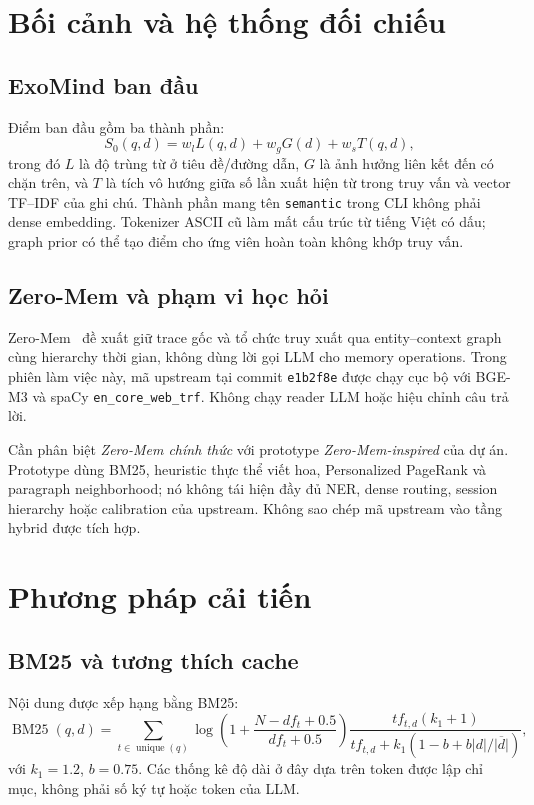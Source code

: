 \documentclass[11pt,a4paper]{article}
\begin{document}
\section{Bối cảnh và hệ thống đối chiếu}
\subsection{ExoMind ban đầu}
Điểm ban đầu gồm ba thành phần:
\begin{equation}
S_0(q,d)=w_l L(q,d)+w_g G(d)+w_s T(q,d),
\end{equation}
trong đó $L$ là độ trùng từ ở tiêu đề/đường dẫn, $G$ là ảnh hưởng liên kết đến có chặn trên, và $T$ là tích vô hướng giữa số lần xuất hiện từ trong truy vấn và vector TF--IDF của ghi chú. Thành phần mang tên \texttt{semantic} trong CLI không phải dense embedding. Tokenizer ASCII cũ làm mất cấu trúc từ tiếng Việt có dấu; graph prior có thể tạo điểm cho ứng viên hoàn toàn không khớp truy vấn.

\subsection{Zero-Mem và phạm vi học hỏi}
Zero-Mem~\cite{zeromem} đề xuất giữ trace gốc và tổ chức truy xuất qua entity--context graph cùng hierarchy thời gian, không dùng lời gọi LLM cho memory operations. Trong phiên làm việc này, mã upstream tại commit \texttt{e1b2f8e} được chạy cục bộ với BGE-M3 và spaCy \texttt{en\_core\_web\_trf}. Không chạy reader LLM hoặc hiệu chỉnh câu trả lời.

Cần phân biệt \emph{Zero-Mem chính thức} với prototype \emph{Zero-Mem-inspired} của dự án. Prototype dùng BM25, heuristic thực thể viết hoa, Personalized PageRank và paragraph neighborhood; nó không tái hiện đầy đủ NER, dense routing, session hierarchy hoặc calibration của upstream. Không sao chép mã upstream vào tầng hybrid được tích hợp.

\section{Phương pháp cải tiến}
\subsection{BM25 và tương thích cache}
Nội dung được xếp hạng bằng BM25:
\begin{equation}
\operatorname{BM25}(q,d)=\sum_{t\in\operatorname{unique}(q)}
\log\left(1+\frac{N-df_t+0.5}{df_t+0.5}\right)
\frac{tf_{t,d}(k_1+1)}{tf_{t,d}+k_1(1-b+b|d|/\overline{|d|})},
\end{equation}
với $k_1=1.2$, $b=0.75$. Các thống kê độ dài ở đây dựa trên token được lập chỉ mục, không phải số ký tự hoặc token của LLM.
\end{document}
